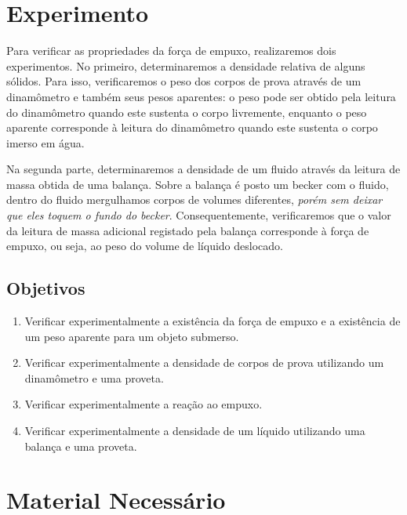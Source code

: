 \section{Experimento}

Para verificar as propriedades da força de empuxo, realizaremos dois experimentos. No primeiro, determinaremos a densidade relativa de alguns sólidos. Para isso, verificaremos o peso dos corpos de prova através de um dinamômetro e também seus pesos aparentes: o peso pode ser obtido pela leitura do dinamômetro quando este sustenta o corpo livremente, enquanto o peso aparente corresponde à leitura do dinamômetro quando este sustenta o corpo imerso em água.

Na segunda parte, determinaremos a densidade de um fluido através da leitura de massa obtida de uma balança. Sobre a balança é posto um becker com o fluido, dentro do fluido mergulhamos corpos de volumes diferentes, \emph{porém sem deixar que eles toquem o fundo do becker}. Consequentemente, verificaremos que o valor da leitura de massa adicional registado pela balança corresponde à força de empuxo, ou seja, ao peso do volume de líquido deslocado.

\subsection{Objetivos}
\label{Sec:ObjetivosEmpuxo}

\begin{enumerate}
	\item Verificar experimentalmente a existência da força de empuxo e a existência de um peso aparente para um objeto submerso.
	\item Verificar experimentalmente a densidade de corpos de prova utilizando um dinamômetro e uma proveta.
	\item Verificar experimentalmente a reação ao empuxo.
	\item Verificar experimentalmente a densidade de um líquido utilizando uma balança e uma proveta.
\end{enumerate}

\section{Material Necessário}


